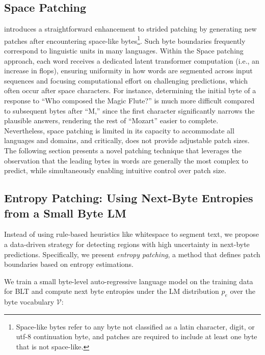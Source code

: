 \subsection{Space Patching}
\label{section:white-patch}

\citet{slagle2024spacebyte} introduces a straightforward enhancement to strided patching by generating new patches after encountering space-like bytes\footnote{
    Space-like bytes refer to any byte not classified as a latin character, digit, or utf-8 continuation byte, and patches are required to include at least one byte that is not space-like.}. Such byte boundaries frequently correspond to linguistic units in many languages. Within the Space patching approach, each word receives a dedicated latent transformer computation (i.e., an increase in flops), ensuring uniformity in how words are segmented across input sequences and focusing computational effort on challenging predictions, which often occur after space characters. For instance, determining the initial byte of a response to “Who composed the Magic Flute?\uline{\hspace{.6em}}” is much more difficult compared to subsequent bytes after “M,” since the first character significantly narrows the plausible answers, rendering the rest of “Mozart” easier to complete. Nevertheless, space patching is limited in its capacity to accommodate all languages and domains, and critically, does not provide adjustable patch sizes. The following section presents a novel patching technique that leverages the observation that the leading bytes in words are generally the most complex to predict, while simultaneously enabling intuitive control over patch size.

\subsection{Entropy Patching: Using Next-Byte Entropies from a Small Byte LM}
\label{section:dyn-patch}

Instead of using rule-based heuristics like whitespace to segment text, we propose a data-driven strategy for detecting regions with high uncertainty in next-byte predictions. Specifically, we present \textit{entropy patching}, a method that defines patch boundaries based on entropy estimations.

We train a small byte-level auto-regressive language model on the training data for {\textsc BLT} and compute next byte entropies under the LM distribution $p_{e}$ over the byte vocabulary $\mathcal{V}$:

